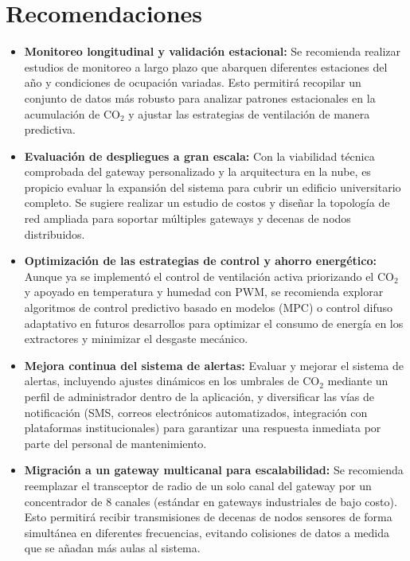 \section{Recomendaciones}

\begin{itemize}
    \item \textbf{Monitoreo longitudinal y validación estacional:} Se recomienda realizar estudios de monitoreo a largo plazo que abarquen diferentes estaciones del año y condiciones de ocupación variadas. Esto permitirá recopilar un conjunto de datos más robusto para analizar patrones estacionales en la acumulación de CO\(_2\) y ajustar las estrategias de ventilación de manera predictiva.

    \item \textbf{Evaluación de despliegues a gran escala:} Con la viabilidad técnica comprobada del gateway personalizado y la arquitectura en la nube, es propicio evaluar la expansión del sistema para cubrir un edificio universitario completo. Se sugiere realizar un estudio de costos y diseñar la topología de red ampliada para soportar múltiples gateways y decenas de nodos distribuidos.

    \item \textbf{Optimización de las estrategias de control y ahorro energético:} Aunque ya se implementó el control de ventilación activa priorizando el CO\(_2\) y apoyado en temperatura y humedad con PWM, se recomienda explorar algoritmos de control predictivo basado en modelos (MPC) o control difuso adaptativo en futuros desarrollos para optimizar el consumo de energía en los extractores y minimizar el desgaste mecánico.

    \item \textbf{Mejora continua del sistema de alertas:} Evaluar y mejorar el sistema de alertas, incluyendo ajustes dinámicos en los umbrales de CO\(_2\) mediante un perfil de administrador dentro de la aplicación, y diversificar las vías de notificación (SMS, correos electrónicos automatizados, integración con plataformas institucionales) para garantizar una respuesta inmediata por parte del personal de mantenimiento.

    \item \textbf{Migración a un gateway multicanal para escalabilidad:} Se recomienda reemplazar el transceptor de radio de un solo canal del gateway por un concentrador de 8 canales (estándar en gateways industriales de bajo costo). Esto permitirá recibir transmisiones de decenas de nodos sensores de forma simultánea en diferentes frecuencias, evitando colisiones de datos a medida que se añadan más aulas al sistema.


\end{itemize}
